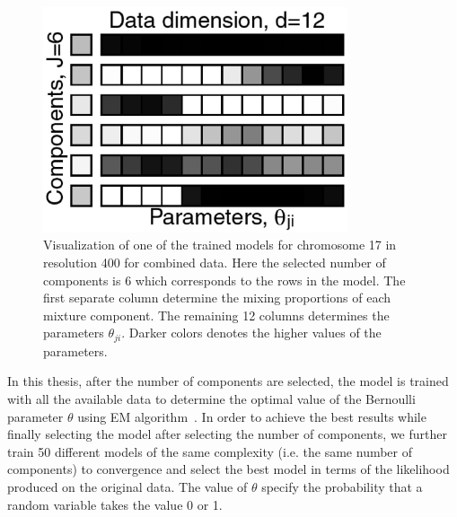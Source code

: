  \begin{figure}[h!]
 \centering
 \includegraphics[width=0.8\textwidth]{figures/mdlchr17dm393}
 \caption[Final Trained Model in chromosome 17 and resolution 400]{Visualization of one of the trained models for chromosome 17 in resolution 400 for combined data. Here the selected number of components is 6 which corresponds to the rows in the model. The first separate column determine the mixing proportions of each mixture component. The remaining 12 columns determines the parameters $\theta_{ji}$. Darker colors denotes the higher values of the parameters.}\label{Fig:mdl1}
 \end{figure}

In this thesis, after the number of components are selected, the model is trained with all the available data to determine the optimal value of the Bernoulli parameter $\theta$ using EM algorithm~\cite{wolfe, everittmixdist}. In order to achieve the best results  while finally selecting the model after selecting the number of components, we further train 50 different models of the same complexity (i.e. the same number of components) to convergence and select the best model in terms of the likelihood produced on the original data. The value of $\theta$ specify the probability that a random variable takes the value 0 or 1. 


